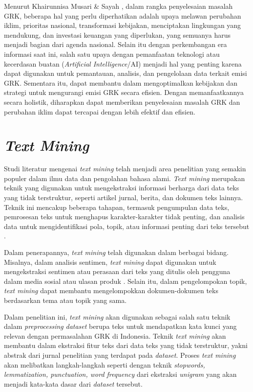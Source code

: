 Menurut Khairunnisa Musari \& Sayah \citep{khairunnisa_musari_green_2021}, dalam rangka penyelesaian masalah GRK, beberapa hal yang perlu diperhatikan adalah upaya melawan perubahan iklim, prioritas nasional, transformasi kebijakan, menciptakan lingkungan yang mendukung, dan investasi keuangan yang diperlukan, yang semuanya harus menjadi bagian dari agenda nasional. Selain itu dengan perkembangan era informasi saat ini, salah satu upaya dengan pemanfaatan teknologi atau kecerdasan buatan (\textit{Artificial Intelligence}/AI) menjadi hal yang penting karena dapat digunakan untuk pemantauan, analisis, dan pengelolaan data terkait emisi GRK. Sementara itu, dapat membantu dalam mengoptimalkan kebijakan dan strategi untuk mengurangi emisi GRK secara efisien. Dengan memanfaatkannya secara holistik, diharapkan dapat memberikan penyelesaian masalah GRK dan perubahan iklim dapat tercapai dengan lebih efektif dan efisien.

\section{\textit{Text Mining}}
Studi literatur mengenai \textit{text mining} telah menjadi area penelitian yang semakin populer dalam ilmu data dan pengolahan bahasa alami. \textit{Text mining} merupakan teknik yang digunakan untuk mengekstraksi informasi berharga dari data teks yang tidak terstruktur, seperti artikel jurnal, berita, dan dokumen teks lainnya. Teknik ini mencakup beberapa tahapan, termasuk pengumpulan data teks, pemrosesan teks untuk menghapus karakter-karakter tidak penting, dan analisis data untuk mengidentifikasi pola, topik, atau informasi penting dari teks tersebut \cite{Salloum2018}.

Dalam penerapannya, \textit{text mining} telah digunakan dalam berbagai bidang. Misalnya, dalam analisis sentimen, \textit{text mining} dapat digunakan untuk mengekstraksi sentimen atau perasaan dari teks yang ditulis oleh pengguna dalam media sosial atau ulasan produk \cite{aqlan2019}. Selain itu, dalam pengelompokan topik, \textit{text mining} dapat membantu mengelompokkan dokumen-dokumen teks berdasarkan tema atau topik yang sama.

Dalam penelitian ini, \textit{text mining} akan digunakan sebagai salah satu teknik dalam \textit{preprocessing} \textit{dataset} berupa teks untuk mendapatkan kata kunci yang relevan dengan permasalahan GRK di Indonesia. Teknik \textit{text mining} akan membantu dalam ekstraksi fitur teks dari data teks yang tidak terstruktur, yakni abstrak dari jurnal penelitian yang terdapat pada \textit{dataset}. Proses \textit{text mining} akan melibatkan langkah-langkah seperti dengan teknik \textit{stopwords, lemmatization, punctuation, word frequency} dari ekstraksi \textit{unigram} yang akan menjadi kata-kata dasar dari \textit{dataset} tersebut.

